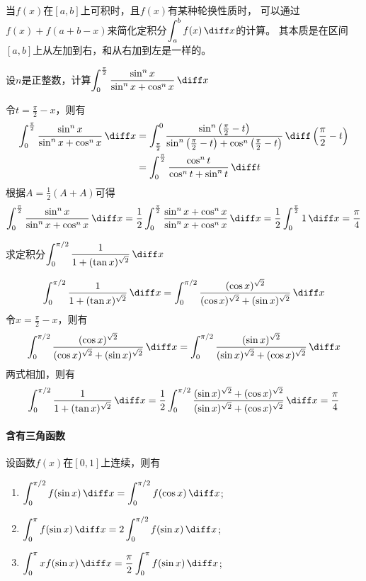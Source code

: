 当$f(x)$在$[a,b]$上可积时，且$f(x)$有某种轮换性质时，
可以通过$f(x)+f(a+b-x)$来简化定积分$\displaystyle\int_a^bf(x)\,\diff x$的计算。
其本质是在区间$[a,b]$上从左加到右，和从右加到左是一样的。
\begin{example}
    设$n$是正整数，计算$\displaystyle\int_0^{\frac{\pi}{2}}\frac{\sin^n x}{\sin^n x + \cos^n x}\,\diff x$
\end{example}
\begin{solution}
    令$t=\frac{\pi}{2}-x$，则有
    \begin{align*}
        \int_0^{\frac{\pi}{2}}\frac{\sin^n x}{\sin^n x + \cos^n x}\,\diff x
         & = \int_{\frac{\pi}{2}}^0\frac{\sin^n \left(\frac{\pi}{2}-t\right)}{\sin^n \left(\frac{\pi}{2}-t\right) + \cos^n \left(\frac{\pi}{2}-t\right)}\,\diff \left(\frac{\pi}{2}-t\right) \\
         & = \int_0^{\frac{\pi}{2}}\frac{\cos^n t}{\cos^n t + \sin^n t}\,\diff t
    \end{align*}
    根据$A = \frac{1}{2}(A+A)$可得
    \[
        \int_0^{\frac{\pi}{2}}\frac{\sin^n x}{\sin^n x + \cos^n x}\,\diff x
        =
        \frac{1}{2}\int_0^{\frac{\pi}{2}}\frac{\sin^n x + \cos^nx}{\sin^n x + \cos^n x}\,\diff x
        =
        \frac{1}{2}\int_0^{\frac{\pi}{2}} 1\,\diff x
        =
        \frac{\pi}{4}
    \]
\end{solution}

\begin{example}
    求定积分$\displaystyle\int_0^{\pi/2} \frac{1}{1+(\tan x)^{\sqrt{2}}}\,\diff x$
\end{example}
\begin{solution}
    \[
        \int_0^{\pi/2} \frac{1}{1+(\tan x)^{\sqrt{2}}}\,\diff x
        =
        \int_0^{\pi/2} \frac{(\cos x)^{\sqrt{2}}}{(\cos x)^{\sqrt{2}}+(\sin x)^{\sqrt{2}}}\,\diff x
    \]
    令$x=\frac{\pi}{2}-x$，则有
    \[
        \int_0^{\pi/2} \frac{(\cos x)^{\sqrt{2}}}{(\cos x)^{\sqrt{2}}+(\sin x)^{\sqrt{2}}}\,\diff x
        =
        \int_0^{\pi/2} \frac{(\sin x)^{\sqrt{2}}}{(\sin x)^{\sqrt{2}}+(\cos x)^{\sqrt{2}}}\,\diff x
    \]
    两式相加，则有
    \[
        \int_0^{\pi/2} \frac{1}{1+(\tan x)^{\sqrt{2}}}\,\diff x
        =
        \frac{1}{2} \int_0^{\pi/2} \frac{(\sin x)^{\sqrt{2}} + (\cos x)^{\sqrt{2}}}{(\sin x)^{\sqrt{2}}+(\cos x)^{\sqrt{2}}}\,\diff x
        =
        \frac{\pi}{4}
    \]
\end{solution}

\paragraph{含有三角函数}
设函数$f(x)$在$[0,1]$上连续，则有
\begin{enumerate}[(1)]
    \item $\displaystyle \int_0^{\pi/2}f(\sin x)\,\diff x = \int_0^{\pi/2}f(\cos x)\,\diff x$;
    \item $\displaystyle \int_0^{\pi}f(\sin x)\,\diff x = 2\int_0^{\pi/2}f(\sin x)\,\diff x$;
    \item $\displaystyle \int_0^{\pi}xf(\sin x)\,\diff x = \frac{\pi}{2}\int_0^{\pi}f(\sin x)\,\diff x$;
\end{enumerate}


